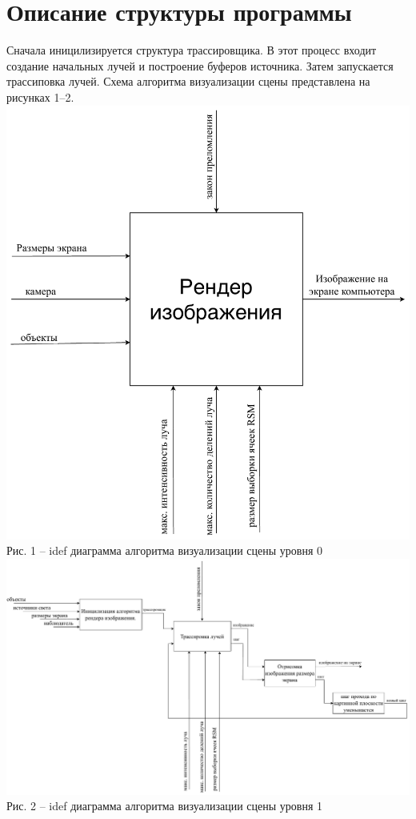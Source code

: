 \section{Описание структуры программы} {
    Сначала иницилизируется структура трассировщика.
    В этот процесс входит создание начальных лучей и построение буферов источника.
    Затем запускается трассиповка лучей.
    Схема алгоритма визуализации сцены представлена на рисунках 1--2. \\
    \includegraphics[width=\linewidth]{./img/idef0} \\
    \small { Рис. 1 --  idef диаграмма алгоритма визуализации сцены уровня 0} \\
    \includegraphics[width=\linewidth]{./img/idef1} \\
    \small { Рис. 2 --  idef диаграмма алгоритма визуализации сцены уровня 1} \\
}